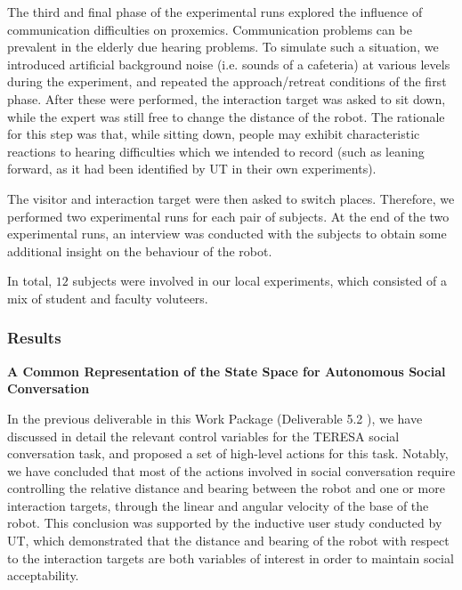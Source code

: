 \documentclass[a4paper,11pt]{report}
\begin{document}
The third and final phase of the experimental runs explored the influence of communication difficulties on proxemics. Communication problems can be prevalent in the elderly due hearing problems. To simulate such a situation, we introduced artificial background noise (i.e. sounds of a cafeteria) at various levels during the experiment, and repeated the approach/retreat conditions of the first phase. After these were performed, the interaction target was asked to sit down, while the expert was still free to change the distance of the robot. The rationale for this step was that, while sitting down, people may exhibit characteristic reactions to hearing difficulties which we intended to record (such as leaning forward, as it had been identified by UT in their own experiments).

The visitor and interaction target were then asked to switch places. Therefore, we performed two experimental runs for each pair of subjects. At the end of the two experimental runs, an interview was conducted with the subjects to obtain some additional insight on the behaviour of the robot.

In total, $12$  subjects were involved in our local experiments, which consisted of a mix of student and faculty voluteers.


\subsubsection{Results}
\label{sec:social_results}

{\bf A Common Representation of the State Space for Autonomous Social Conversation}
\label{sec:defining_the_state-space}

In the previous deliverable in this Work Package (Deliverable 5.2 \cite{d5.2}), we have discussed in detail the relevant control variables for the TERESA social conversation task, and proposed a set of high-level actions for this task. Notably, we have concluded that most of the actions involved in social conversation require controlling the relative distance and bearing between the robot and one or more interaction targets, through the linear and angular velocity of the base of the robot. This conclusion was supported by the inductive user study conducted by UT, which demonstrated that the distance and bearing of the robot with respect to the interaction targets are both variables of interest in order to maintain social acceptability. 
\end{document}
